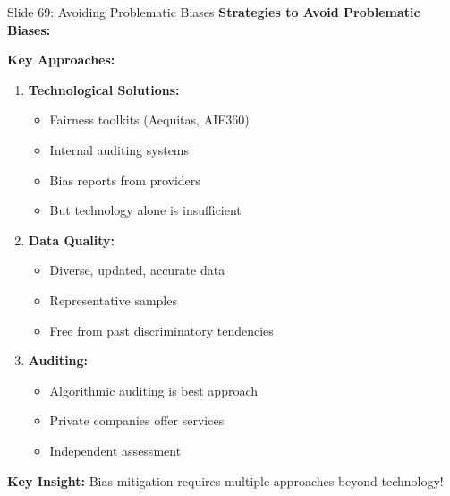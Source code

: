 \documentclass[8pt]{beamer}
\begin{document}
	\begin{frame}{Slide 69: Avoiding Problematic Biases}
		\fontsize{6.5}{7.5}\selectfont
		\textbf{Strategies to Avoid Problematic Biases:}
		
		\vspace{0.1cm}
		\textbf{Key Approaches:}
		\begin{enumerate}
			\item \textbf{Technological Solutions:}
			\begin{itemize}
				\item Fairness toolkits (Aequitas, AIF360)
				\item Internal auditing systems
				\item Bias reports from providers
				\item But technology alone is insufficient
			\end{itemize}
			\item \textbf{Data Quality:}
			\begin{itemize}
				\item Diverse, updated, accurate data
				\item Representative samples
				\item Free from past discriminatory tendencies
			\end{itemize}
			\item \textbf{Auditing:}
			\begin{itemize}
				\item Algorithmic auditing is best approach
				\item Private companies offer services
				\item Independent assessment
			\end{itemize}
		\end{enumerate}
		
		\textcolor{myblue}{\textbf{Key Insight:}} Bias mitigation requires \textcolor{myblue}{multiple approaches beyond technology}!
	\end{frame}
	
\end{document}
